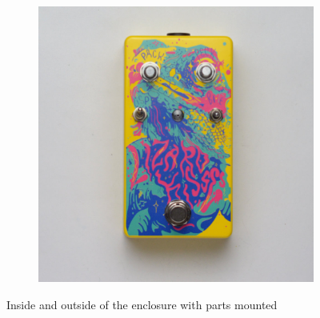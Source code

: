\documentclass[a4paper,12pt]{article}
\begin{document}
\begin{figure}[h!]
\begin{subfigure}[b]{0.49\textwidth}
    \includegraphics[width=\textwidth]{build/08-enclosure-mount-1000px.jpg}
  \end{subfigure}
  \caption{Inside and outside of the enclosure with parts
  mounted}
\end{figure}
\end{document}
